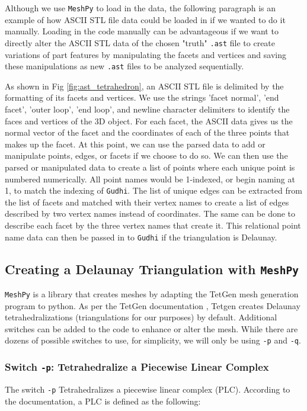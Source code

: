 \documentclass[ma]{uncgdissertationexp}
\theoremstyle{plain}
\theoremstyle{definition}
\theoremstyle{remark}
\begin{document}
\par Although we use \verb"MeshPy" to load in the data, the following paragraph is an example of how ASCII STL file data could be loaded in if we wanted to do it manually. Loading in the code manually can be advantageous if we want to directly alter the ASCII STL data of the chosen "truth" \verb".ast" file to create variations of part features by manipulating the facets and vertices and saving these manipulations as new \verb".ast" files to be analyzed sequentially.

\par As shown in Fig \ref{fig:ast_tetrahedron}, an ASCII STL file is delimited by the formatting of its facets and vertices. We use the strings 'facet normal', 'end facet', 'outer loop', 'end loop', and newline character delimiters to identify the faces and vertices of the 3D object. For each facet, the ASCII data gives us the normal vector of the facet and the coordinates of each of the three points that makes up the facet. At this point, we can use the parsed data to add or manipulate points, edges, or facets if we choose to do so. We can then use the parsed or manipulated data to create a list of points where each unique point is numbered numerically. All point names would be 1-indexed, or begin naming at 1, to match the indexing of \verb"Gudhi". The list of unique edges can be extracted from the list of facets and matched with their vertex names to create a list of edges described by two vertex names instead of coordinates. The same can be done to describe each facet by the three vertex names that create it. This relational point name data can then be passed in to \verb"Gudhi" if the triangulation is Delaunay.

\cprotect\subsection{Creating a Delaunay Triangulation with \verb+MeshPy+}
\label{sec:implement_meshpy}
\par \verb"MeshPy" is a library that creates meshes by adapting the TetGen mesh generation program to python. As per the TetGen documentation \cite{tetgen}, Tetgen creates Delaunay tetrahedralizations (triangulations for our purposes) by default. Additional switches can be added to the code to enhance or alter the mesh. While there are dozens of possible switches to use, for simplicity, we will only be using \verb"-p" and \verb"-q".
\newpage
\cprotect\subsubsection{Switch \verb+-p+: Tetrahedralize a Piecewise Linear Complex}
\par The switch \verb"-p" Tetrahedralizes a piecewise linear complex (PLC). According to the documentation, a PLC is defined as the following:
\end{document}
